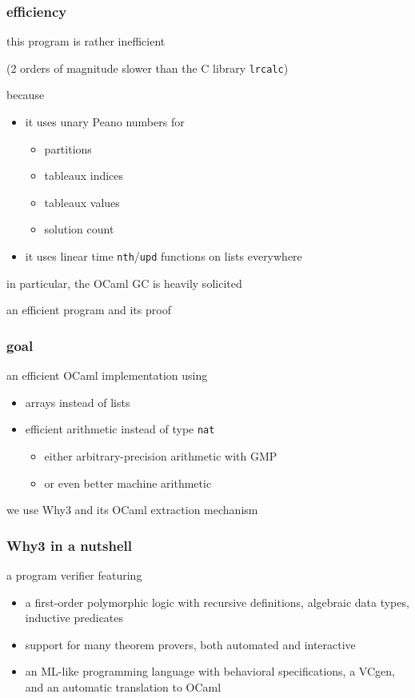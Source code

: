 \documentclass{beamer}
\let\emph\alert
\begin{document}
\begin{frame}\frametitle{efficiency}
  this program is rather inefficient

  (2 orders of magnitude slower than the C library \texttt{lrcalc})

  \bigskip
  because
  \begin{itemize}
  \item it uses \emph{unary Peano numbers} for
    \begin{itemize}
    \item partitions
    \item tableaux indices
    \item tableaux values
    \item solution count
    \end{itemize}
  \item it uses \emph{linear time} \texttt{nth}/\texttt{upd} functions on lists
    everywhere
  \end{itemize}

  \bigskip
  in particular, the OCaml GC is heavily solicited
\end{frame}

\begin{frame}
  \begin{center}
    \emph{an efficient program and its proof} \\
    \hrulefill
  \end{center}
\end{frame}

\begin{frame}\frametitle{goal}
  an efficient OCaml implementation using
  \begin{itemize}
  \item arrays instead of lists
  \item efficient arithmetic instead of type \texttt{nat}
    \begin{itemize}
    \item either arbitrary-precision arithmetic with GMP
    \item or even better machine arithmetic
    \end{itemize}
  \end{itemize}

  \bigskip\bigskip
  we use Why3 and its OCaml extraction mechanism
\end{frame}

\begin{frame}\frametitle{Why3 in a nutshell}
  a program verifier featuring
  \begin{itemize}
  \item a \emph{first-order polymorphic logic} with recursive definitions,
    algebraic data types, inductive predicates
  \item support for \emph{many theorem provers}, both automated and
    interactive
  \item an \emph{ML-like programming language} with behavioral specifications,
    a VCgen, and an automatic translation to OCaml
  \end{itemize}
\end{frame}
\end{document}
